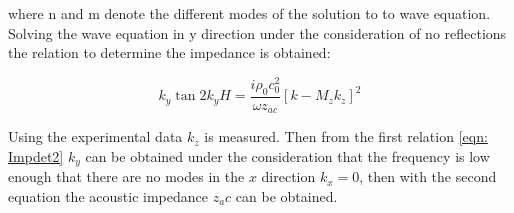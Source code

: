 \documentclass[11pt]{report} %
\begin{document}
where n and m denote the different modes of the solution to to wave equation.\\
Solving the wave equation in y direction under the consideration of no reflections the relation to determine the impedance is obtained: 

\begin{equation}\label{eqn: Impdet1}
    k_y \tan 2k_y H = \frac{i \rho_0 c_0^2}{\omega z_{ac}} \left[k-M_zk_z\right]^2
\end{equation}

Using the experimental data $k_z$ is measured. 
Then from the first relation \ref{eqn: Impdet2} $k_y$ can be obtained under the consideration that the frequency is low enough that there are no modes in the $x$ direction $k_x = 0$, then with the second equation the acoustic impedance $z_ac$ can be obtained.
 
\end{document}
